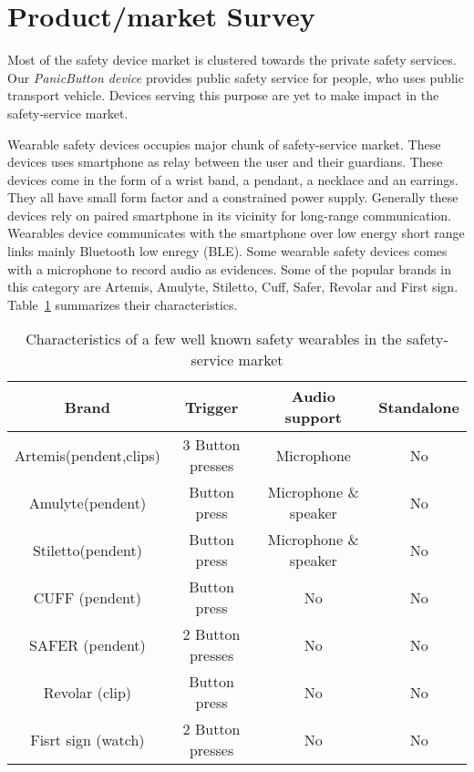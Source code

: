 \section{Product/market Survey}
Most of the safety device market is clustered towards the private safety services. Our \emph{PanicButton device} provides public safety service for people, who uses public transport vehicle. Devices serving this purpose are yet to make impact in the safety-service market.

Wearable safety devices occupies major chunk of safety-service market. These devices uses smartphone as relay between the user and their guardians. These devices come in  the form of a wrist band, a pendant, a necklace and an earrings. They all have small form factor and a constrained power supply. Generally these devices rely on paired smartphone in its vicinity for long-range communication. Wearables device communicates with the smartphone over low energy short range links mainly Bluetooth low enregy (BLE). Some wearable safety devices comes with a microphone to record audio as evidences. Some of the popular brands in this category are Artemis, Amulyte, Stiletto, Cuff, Safer, Revolar and First sign. Table~\ref{tab:markettable} summarizes their characteristics.
\begin{table}[H]
\begin{center}
\begin{tabular}{ |c|c|c|c| } 
 \hline
 \textbf{Brand} & \textbf{Trigger} & \textbf{Audio support} &\textbf{Standalone}\\
 \hline 
 Artemis(pendent,clips)\cite{safe1} & 3 Button presses & Microphone & No \\
\hline 
Amulyte(pendent)\cite{safe2} & Button press & Microphone \& speaker & No \\
\hline
Stiletto(pendent)\cite{safe3} & Button press & Microphone \& speaker & No \\
\hline
CUFF (pendent)\cite{safe4} & Button press & No & No \\
\hline
SAFER (pendent)\cite{safe5} & 2 Button presses & No & No \\
\hline
Revolar (clip)\cite{safe6} & Button press & No & No \\
\hline 
Fisrt sign (watch)\cite{safe7} & 2 Button presses & No & No \\
 \hline
\end{tabular}
\end{center}
\caption{Characteristics of a few well known safety wearables in the safety-service market} 
\label{tab:markettable}
\end{table}

